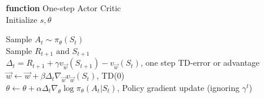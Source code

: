 \documentclass{standalone}
\begin{document}
\pagestyle{empty}
\begin{algorithm}[H]
  \textbf{function} One-step Actor Critic \\
  	Initialize $s, \theta$ \\

  	 {
  	Sample $A_t \sim \pi_\theta(S_t)$ \\
  	Sample $R_{t+1} \text{ and } S_{t+1}$ \\
  	$\Delta_t = R_{t+1} + \gamma v_{\vec{w}}(S_{t+1}) -v_{\vec{w}}(S_{t})$, one step TD-error or advantage\\
  	$\vec{w} \leftarrow \vec{w} + \beta \Delta_t \nabla_{\vec{w}} v_{\vec{w}}(S_t)$, TD(0)\\
	$\theta \leftarrow \theta + \alpha \Delta_t \nabla_{\theta} \log \pi_{\theta}(A_t|S_t)$, Policy gradient update (ignoring $\gamma^t$)
  
}

\end{algorithm}
\end{document}
